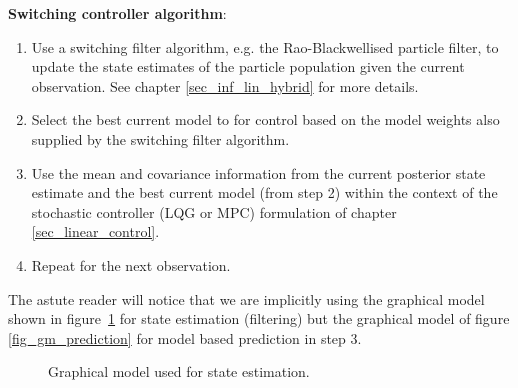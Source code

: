 \textbf{Switching controller algorithm}:
\begin{enumerate}
\item
Use a switching filter algorithm, e.g. the Rao-Blackwellised particle filter, to update the state estimates of the particle population given the current observation. See chapter \ref{sec_inf_lin_hybrid} for more details.
\item
Select the best current model to for control based on the model weights also supplied by the switching filter algorithm.
\item
Use the mean and covariance information from the current posterior state estimate and the best current model (from step 2) within the context of the stochastic controller (LQG or MPC) formulation of chapter \ref{sec_linear_control}.
\item
Repeat for the next observation. 
\end{enumerate} 
The astute reader will notice that we are implicitly using the graphical model shown in figure~\ref{fig_gm_filter} for state estimation (filtering) but the graphical model of figure \ref{fig_gm_prediction} for model based prediction in step 3.
\begin{figure}[H] 
\centering
{}
\caption{Graphical model used for state estimation.}
\label{fig_gm_filter}
\end{figure}

